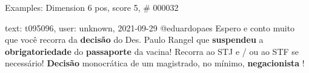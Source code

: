\begin{frame}{Examples: Dimension 6 pos, score 5, \# 000032}
\footnotesize
\begin{exampleblock}{text: t095096, user: unknown, 2021-09-29}
@eduardopaes Espero e conto muito que você recorra da \textbf{decisão} do Des. 
Paulo Rangel que \textbf{suspendeu} a \textbf{obrigatoriedade} do 
\textbf{passaporte} da vacina! Recorra ao STJ e / ou ao STF se necessário! 
\textbf{Decisão} monocrática de um magistrado, no mínimo, \textbf{negacionista} 
! 
\end{exampleblock}
\end{frame}
